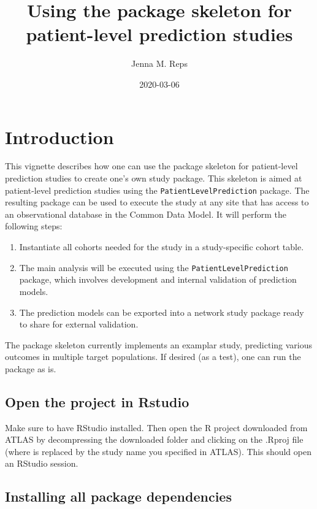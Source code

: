 \documentclass[
]{article}
\title{Using the package skeleton for patient-level prediction studies}
\author{Jenna M. Reps}
\date{2020-03-06}
\providecommand{\tightlist}{%
  \setlength{\itemsep}{0pt}\setlength{\parskip}{0pt}}
\begin{document}
\maketitle

{
\setcounter{tocdepth}{2}
\tableofcontents
}
\hypertarget{introduction}{%
\section{Introduction}\label{introduction}}

This vignette describes how one can use the package skeleton for
patient-level prediction studies to create one's own study package. This
skeleton is aimed at patient-level prediction studies using the
\texttt{PatientLevelPrediction} package. The resulting package can be
used to execute the study at any site that has access to an
observational database in the Common Data Model. It will perform the
following steps:

\begin{enumerate}
\def\labelenumi{\arabic{enumi}.}
\tightlist
\item
  Instantiate all cohorts needed for the study in a study-specific
  cohort table.
\item
  The main analysis will be executed using the
  \texttt{PatientLevelPrediction} package, which involves development
  and internal validation of prediction models.
\item
  The prediction models can be exported into a network study package
  ready to share for external validation.
\end{enumerate}

The package skeleton currently implements an examplar study, predicting
various outcomes in multiple target populations. If desired (as a test),
one can run the package as is.

\hypertarget{open-the-project-in-rstudio}{%
\subsection{Open the project in
Rstudio}\label{open-the-project-in-rstudio}}

Make sure to have RStudio installed. Then open the R project downloaded
from ATLAS by decompressing the downloaded folder and clicking on the
.Rproj file (where is replaced by the study name you specified in
ATLAS). This should open an RStudio session.

\hypertarget{installing-all-package-dependencies}{%
\subsection{Installing all package
dependencies}\label{installing-all-package-dependencies}}
\end{document}
